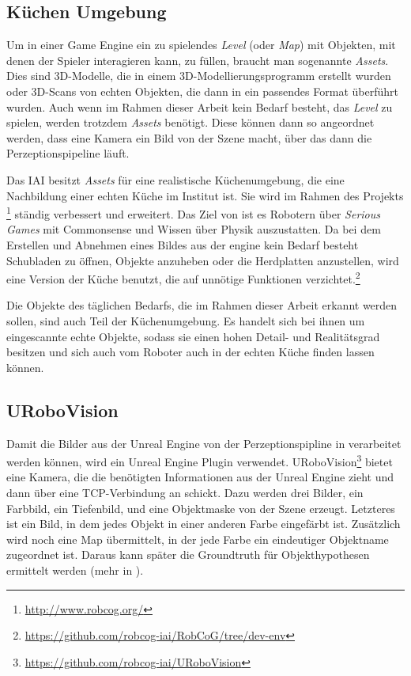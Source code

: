 \subsection{Küchen Umgebung}
\label{subsec:kitchenenvironment}
Um in einer Game Engine ein zu spielendes \textit{Level} (oder \textit{Map}) mit Objekten, mit denen der Spieler interagieren kann, zu füllen, braucht man sogenannte \textit{Assets}. Dies sind 3D-Modelle, die in einem 3D-Modellierungsprogramm erstellt wurden oder 3D-Scans von echten Objekten, die dann in ein passendes Format überführt wurden. Auch wenn im Rahmen dieser Arbeit kein Bedarf besteht, das \textit{Level} zu spielen, werden trotzdem \textit{Assets} benötigt. Diese können dann so angeordnet werden, dass eine Kamera ein Bild von der Szene macht, über das dann die Perzeptionspipeline läuft. \par
Das IAI besitzt \textit{Assets} für eine realistische Küchenumgebung, die eine Nachbildung einer echten Küche im Institut ist. Sie wird im Rahmen des Projekts \robcog\footnote{\url{http://www.robcog.org/}} ständig verbessert und erweitert. Das Ziel von \robcog ist es Robotern über \textit{Serious Games} mit Commonsense und Wissen über Physik auszustatten. Da bei dem Erstellen und Abnehmen eines Bildes aus der \acrshort{engine} kein Bedarf besteht Schubladen zu öffnen, Objekte anzuheben oder die Herdplatten anzustellen, wird eine Version der Küche benutzt, die auf unnötige Funktionen verzichtet.\footnote{\url{https://github.com/robcog-iai/RobCoG/tree/dev-env}} \par
Die Objekte des täglichen Bedarfs, die im Rahmen dieser Arbeit erkannt werden sollen, sind auch Teil der Küchenumgebung. Es handelt sich bei ihnen um eingescannte echte Objekte, sodass sie einen hohen Detail- und Realitätsgrad besitzen und sich auch vom Roboter auch in der echten Küche finden lassen können.
 
\subsection{URoboVision}
\label{subsec:urobovision}
Damit die Bilder aus der Unreal Engine von der Perzeptionspipline in \robosherlock verarbeitet werden können, wird ein Unreal Engine Plugin verwendet. URoboVision\footnote{\url{https://github.com/robcog-iai/URoboVision}} bietet eine Kamera, die die benötigten Informationen aus der Unreal Engine zieht und dann über eine TCP-Verbindung an \robosherlock schickt. Dazu werden drei Bilder, ein Farbbild, ein Tiefenbild, und eine Objektmaske von der Szene erzeugt. Letzteres ist ein Bild, in dem jedes Objekt in einer anderen Farbe eingefärbt ist. Zusätzlich wird noch eine Map übermittelt, in der jede Farbe ein eindeutiger Objektname zugeordnet ist. Daraus kann später die Groundtruth für Objekthypothesen  ermittelt werden (mehr in ).   

